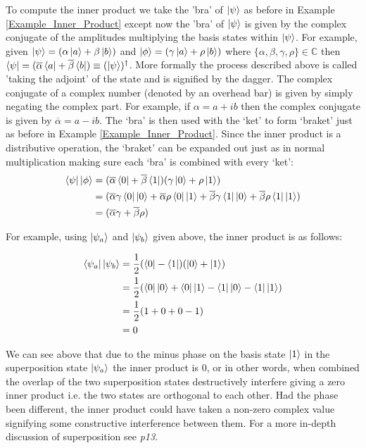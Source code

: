 To compute the inner product we take the 'bra' of $\left\vert{\psi}\right\rangle$ as before in Example \ref{Example_Inner_Product} except now the 'bra' of $\left\vert{\psi}\right\rangle$ is given by the complex conjugate of the amplitudes multiplying the basis states within $\left\vert{\psi}\right\rangle$. For example, given $\left\vert{\psi}\right\rangle=(\alpha\left\vert{a}\right\rangle+\beta\left\vert{b}\right\rangle)$ and $\left\vert{\phi}\right\rangle=(\gamma\left\vert{a}\right\rangle+\rho\left\vert{b}\right\rangle)$ where $\{\alpha, \beta, \gamma, \rho\} \in \mathbb{C}$ then $\left\langle{\psi}\right\vert=(\overline{\alpha}\left\langle{a}\right\vert+\overline{\beta}\left\langle{b}\right\vert)\equiv (\left\vert{\psi}\right\rangle)^\dagger$. More formally the process described above is called 'taking the adjoint' of the state and is signified by the dagger.
The complex conjugate of a complex number (denoted by an overhead bar) is given by simply negating the complex part. For example, if $\alpha=a+ib$ then the complex conjugate is given by $\overline{\alpha}=a-ib$. The `bra' is then used with the `ket' to form `braket' just as before in Example \ref{Example_Inner_Product}. Since the inner product is a distributive operation, the `braket' can be expanded out just as in normal multiplication making sure each `bra' is combined with every `ket':\\

\begin{equation}
\begin{split}
\left\langle{\psi}\right\vert\left\vert{\phi}\right\rangle&=(\overline{\alpha}\left\langle{0}\right\vert+\overline{\beta}\left\langle{1}\right\vert)(\gamma\left\vert{0}\right\rangle+\rho\left\vert{1}\right\rangle)\\
&=(\overline{\alpha}\gamma\left\langle{0}\right\vert\left\vert{0}\right\rangle+\overline{\alpha}\rho\left\langle{0}\right\vert\left\vert{1}\right\rangle+\overline{\beta}\gamma\left\langle{1}\right\vert\left\vert{0}\right\rangle+\overline{\beta}\rho\left\langle{1}\right\vert\left\vert{1}\right\rangle)\\
&=(\overline{\alpha}\gamma+\overline{\beta}\rho)
\end{split}
\end{equation}

For example, using $\left\vert{\psi_{a}}\right\rangle$ and $\left\vert{\psi_{b}}\right\rangle$ given above, the inner product is as follows:

\begin{equation}
\begin{split}
\left\langle{\psi_a}\right\vert\left\vert{\psi_b}\right\rangle &= \frac{1}{2}(\left\langle{0}\right\vert-\left\langle{1}\right\vert)(\left\vert{0}\right\rangle+\left\vert{1}\right\rangle)\\
&=\frac{1}{2}(\left\langle{0}\right\vert\left\vert{0}\right\rangle+\left\langle{0}\right\vert\left\vert{1}\right\rangle-\left\langle{1}\right\vert\left\vert{0}\right\rangle-\left\langle{1}\right\vert\left\vert{1}\right\rangle)\\
&=\frac{1}{2}(1+0+0-1)\\
&=0
\end{split}
\end{equation}

We can see above that due to the minus phase on the basis state $\left\vert{1}\right\rangle$ in the superposition state $\left\vert{\psi_a}\right\rangle$ the inner product is 0, or in other words, when combined the overlap of the two superposition states destructively interfere giving a zero inner product i.e. the two states are orthogonal to each other. Had the phase been different, the inner product could have taken a non-zero complex value signifying some constructive interference between them. For a more in-depth discussion of superposition see \cite{nielsen_chuang_2010} \textit{p13}.

